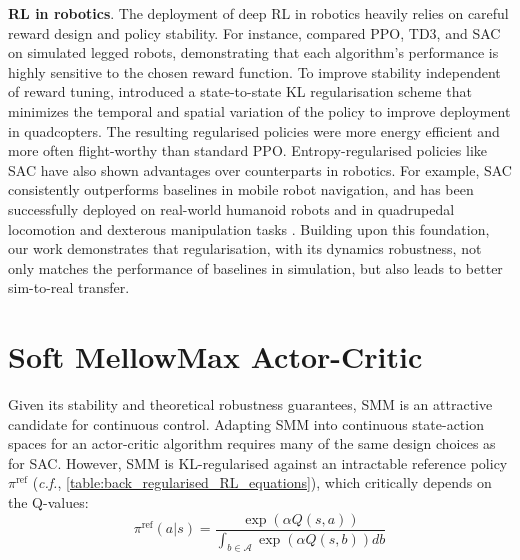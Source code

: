 \documentclass{article} %
\newcommand{\cf}{\textit{c.f.}}
\newcommand{\john}[1]{{\footnotesize \color{purple} John: {#1}}}
\begin{document}
        \textbf{RL in robotics}.
            The deployment of deep RL in robotics heavily relies on careful reward design and policy stability. For instance, \citet{mock_2023_compare_PPO_TD3_SAC_sim_legged_robo} compared PPO, TD3, and SAC on simulated legged robots, demonstrating that each algorithm's performance is highly sensitive to the chosen reward function. To improve stability independent of reward tuning, \citet{mysore2021regularizing} introduced a state-to-state KL regularisation scheme that minimizes the temporal and spatial variation of the policy to improve deployment in quadcopters.
            The resulting regularised policies were more energy efficient and more often flight-worthy than standard PPO.
            Entropy-regularised policies like SAC have also shown advantages over counterparts in robotics. For example, SAC consistently outperforms baselines in mobile robot navigation, and has been successfully deployed on real-world humanoid robots and in quadrupedal locomotion and dexterous manipulation tasks \citep{ddpg_sac_mobile_robots, haarnoja2018SAC_2, seo2025learning_fastsac, kim2026flashsac}.
            Building upon this foundation, our work demonstrates that regularisation, with its dynamics robustness, not only matches the performance of baselines in simulation, but also leads to better sim-to-real transfer.

\section{Soft MellowMax Actor-Critic}
\label{sec:smm_ac}

    Given its stability and theoretical robustness guarantees, SMM is an attractive candidate for continuous control.
    Adapting SMM into continuous state-action spaces for an actor-critic algorithm requires many of the same design choices as for SAC. However, SMM is KL-regularised against an intractable reference policy $ \pi^\text{ref}$ (\cf, \autoref{table:back_regularised_RL_equations}), which critically depends on the Q-values:
    \begin{equation}
    \label{eq:SMM_theoretical_ref}
    \pi^\text{ref}(a|s) = \frac{\exp(\alpha Q(s, a))}{\int_{b\in\mathcal{A}} \exp(\alpha Q(s,b)) db}
    \end{equation}
     
\end{document}
